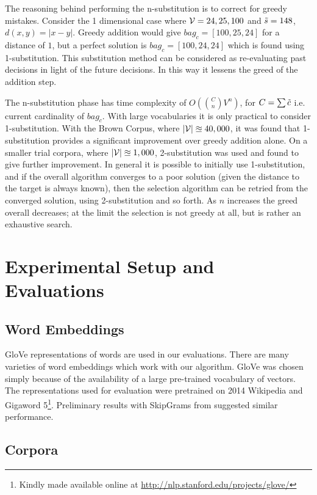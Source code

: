 {The reasoning behind performing the n-substitution is to correct for greedy mistakes. Consider the 1 dimensional case where $\mathcal{V}={24,25,100}$ and $\tilde{s}=148$, $d(x,y)=\left|x-y\right|$. Greedy addition would give  $bag_c=[100,25,24]$ for a distance of $1$, but a perfect solution  is $bag_c=[100,24,24]$ which is found using 1-substitution. This substitution method can be considered as re-evaluating past decisions in light of the future decisions. In this way it lessens the greed of the addition step. 

The n-substitution phase has time complexity of $O(\binom{C}{n}V^n)$, for $C=\sum \tilde{c}$ i.e. current cardinality of $bag_c$. With large vocabularies it is only practical to consider 1-substitution. With the Brown Corpus, where $|\mathcal{V}|\approxeq 40,000$, it was found that 1-substitution provides a significant improvement over greedy addition alone. On a smaller trial corpora, where $|\mathcal{V}|\approxeq 1,000$, 2-substitution was used and found to give further improvement. In general it is possible to initially use 1-substitution, and if the overall algorithm converges to a poor solution (given the distance to the target is always known), then the selection algorithm can be retried from the converged solution, using 2-substitution and so forth. As $n$ increases the greed overall decreases; at the limit the selection is not greedy at all, but is rather an exhaustive search.


\section{Experimental Setup and Evaluations} \label{evalsettingsBG}


\subsection{Word Embeddings}
GloVe representations of words \parencite{pennington2014glove} are used in our evaluations. There are many varieties of word embeddings which work with our algorithm. GloVe was chosen simply because of the availability of a large pre-trained vocabulary of vectors. The representations used for evaluation were pretrained on 2014 Wikipedia and Gigaword 5\footnote{Kindly made available online at \url{http://nlp.stanford.edu/projects/glove/}}. Preliminary results with SkipGrams from \textcite{mikolov2013efficient} suggested similar performance.

\subsection{Corpora}

}
